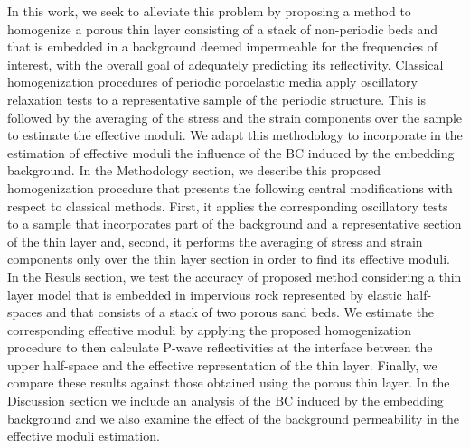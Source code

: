 \documentclass[draft]{agujournal2019}
\begin{document}

In this work, we seek to alleviate this problem by proposing a method to homogenize a porous thin layer consisting of a stack of non-periodic beds and that is embedded in a background deemed impermeable for the frequencies of interest, with the overall goal of adequately predicting its reflectivity. Classical homogenization procedures of periodic poroelastic media apply oscillatory relaxation tests to a representative sample of the periodic structure. This is followed by the averaging of the stress and the strain components over the sample to estimate the effective moduli. We adapt this methodology to incorporate in the estimation of effective moduli the influence of the BC induced by the embedding background.
In the Methodology section, we describe this proposed homogenization procedure that presents the following central modifications with respect to classical methods. First, it applies the corresponding oscillatory tests to a sample that incorporates part of the background and a representative section of the 
thin layer and, second, it performs the averaging of stress and strain components only over the thin layer section in order to find its effective moduli. In the Resuls section, we
test the accuracy of proposed method considering a thin layer model that is embedded in impervious rock represented by elastic half-spaces and that consists of a stack of two  porous sand beds. We estimate the corresponding effective moduli by applying the proposed homogenization procedure to then calculate P-wave reflectivities at the interface between the upper half-space and the effective representation of the thin  layer. Finally, we compare these results against those obtained using the porous thin layer. In the Discussion section we include an analysis of the BC induced by the embedding background and we also examine the effect of the background permeability in the effective moduli  estimation.
\end{document}
